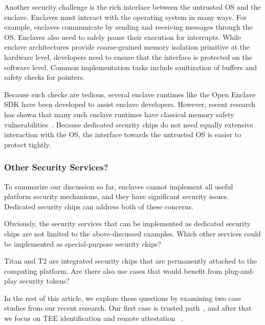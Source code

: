 Another security challenge is the rich interface between the untrusted OS and the enclave. Enclaves must interact with the operating system in many ways. For example, enclaves communicate by sending and receiving messages through the OS. Enclaves also need to safely pause their execution for interrupts. While enclave architectures provide coarse-grained memory isolation primitive at the hardware level, developers need to ensure that the interface is protected on the software level. Common implementation tasks include sanitization of buffers and safety checks for pointers. 

Because such checks are tedious, several enclave runtimes like the Open Enclave SDK have been developed to assist enclave developers. However, recent research has shown that many such enclave runtimes have classical memory safety vulnerabilities~\cite{van2019tale}. Because dedicated security chips do not need equally extensive interaction with the OS, the interface towards the untrusted OS is easier to protect tightly. 


\subsubsection*{Other Security Services?}

To summarize our discussion so far, enclaves cannot implement all useful platform security mechanisms, and they have significant security issues. Dedicated security chips can address both of these concerns. 

Obviously, the security services that can be implemented as dedicated security chips are not limited to the above-discussed examples. Which other services could be implemented as special-purpose security chips? 

Titan and T2 are integrated security chips that are permanently attached to the computing platform. Are there also use cases that would benefit from plug-and-play security tokens?

In the rest of this article, we explore these questions by examining two case studies from our recent research. Our first case is trusted path~\cite{protection},  and after that we focus on TEE identification and remote attestation~\cite{proximitee} .
